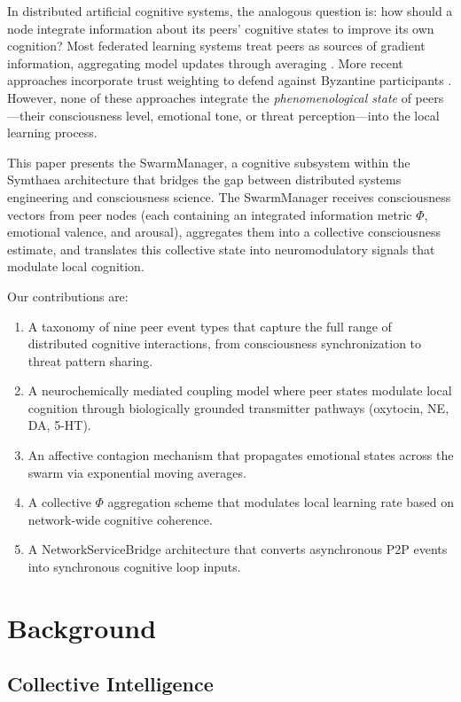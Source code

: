 \documentclass[11pt,a4paper]{article}
\begin{document}
In distributed artificial cognitive systems, the analogous question is: how should a node integrate information about its peers' cognitive states to improve its own cognition? Most federated learning systems treat peers as sources of gradient information, aggregating model updates through averaging \citep{mcmahan2017}. More recent approaches incorporate trust weighting to defend against Byzantine participants \citep{blanchard2017}. However, none of these approaches integrate the \emph{phenomenological state} of peers---their consciousness level, emotional tone, or threat perception---into the local learning process.

This paper presents the SwarmManager, a cognitive subsystem within the Symthaea architecture that bridges the gap between distributed systems engineering and consciousness science. The SwarmManager receives consciousness vectors from peer nodes (each containing an integrated information metric $\Phi$, emotional valence, and arousal), aggregates them into a collective consciousness estimate, and translates this collective state into neuromodulatory signals that modulate local cognition.

Our contributions are:

\begin{enumerate}
  \item A taxonomy of nine peer event types that capture the full range of distributed cognitive interactions, from consciousness synchronization to threat pattern sharing.
  \item A neurochemically mediated coupling model where peer states modulate local cognition through biologically grounded transmitter pathways (oxytocin, NE, DA, 5-HT).
  \item An affective contagion mechanism that propagates emotional states across the swarm via exponential moving averages.
  \item A collective $\Phi$ aggregation scheme that modulates local learning rate based on network-wide cognitive coherence.
  \item A NetworkServiceBridge architecture that converts asynchronous P2P events into synchronous cognitive loop inputs.
\end{enumerate}

\section{Background}

\subsection{Collective Intelligence}
\end{document}

